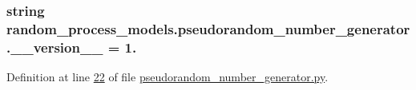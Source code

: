 \subsubsection[{\+\_\+\+\_\+version\+\_\+\+\_\+}]{\setlength{\rightskip}{0pt plus 5cm}string random\+\_\+process\+\_\+models.\+pseudorandom\+\_\+number\+\_\+generator.\+\_\+\+\_\+version\+\_\+\+\_\+ = \textquotesingle{}1.\textquotesingle{}}\label{namespacerandom__process__models_1_1pseudorandom__number__generator_a86f3eea01762559cc8455c47914c636b}


Definition at line \hyperlink{pseudorandom__number__generator_8py_source_l00022}{22} of file \hyperlink{pseudorandom__number__generator_8py_source}{pseudorandom\+\_\+number\+\_\+generator.\+py}.

